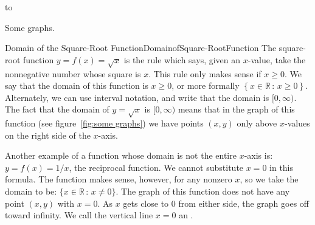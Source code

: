 \figure[H]
\centerline{
\hbox to }
\caption{Some graphs. \label{fig:some graphs}}
\endfigure 

\begin{example}{Domain of the Square-Root Function}{DomainofSquare-RootFunction}
The square-root function $y=f(x)=\sqrt{x}$ is the rule
which says, given an $x$-value, take the nonnegative number whose
square is $x$.  This rule only makes sense if $x\ge 0$. %
We say that the domain of this function is $x\ge 0$, or more formally
$\left\{x\in\mathbb{R}\,:\,x\ge 0\right\}$.  Alternately, we
can use interval notation, and write that the domain is $[0,\infty)$.
The fact that the domain of $y=\sqrt{x}$ is $[0,\infty)$ means that in the
graph of this function (see figure~\ref{fig:some graphs})
we have points $(x,y)$ only above $x$-values on the right side of the
$x$-axis.
\end{example}

Another example of a function whose domain is not the entire $x$-axis
is: $y=f(x)=1/x$, the reciprocal function.  We cannot substitute $x=0$
in this formula.  The function makes sense, however, for any nonzero
$x$, so we take the domain to be: $\{x\in\mathbb{R}\,:\,x\ne 0\}$.  The graph
of this function does not have any point $(x,y)$ with $x=0$.  As $x$
gets close to 0 from either side, the graph goes off toward infinity.
We call the vertical line $x=0$ an .

